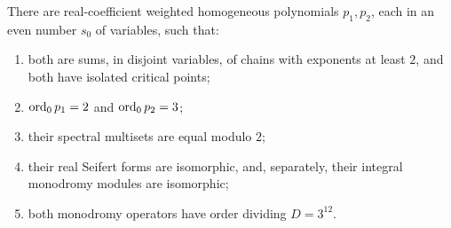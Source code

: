 \begin{proposition}\label{seed:seeds}
There are real-coefficient weighted homogeneous polynomials
$p_1,p_2$, each in an even number $s_0$ of variables, such that:
\begin{enumerate}
\item both are sums, in disjoint variables, of chains with exponents
      at least $2$, and both have isolated critical points;
\item $\operatorname{ord}_0p_1=2$ and $\operatorname{ord}_0p_2=3$;
\item their spectral multisets are equal modulo $2$;
\item their real Seifert forms are isomorphic, and, separately, their
      integral monodromy modules are isomorphic;
\item both monodromy operators have order dividing $D=3^{12}$.
\end{enumerate}
\end{proposition}

